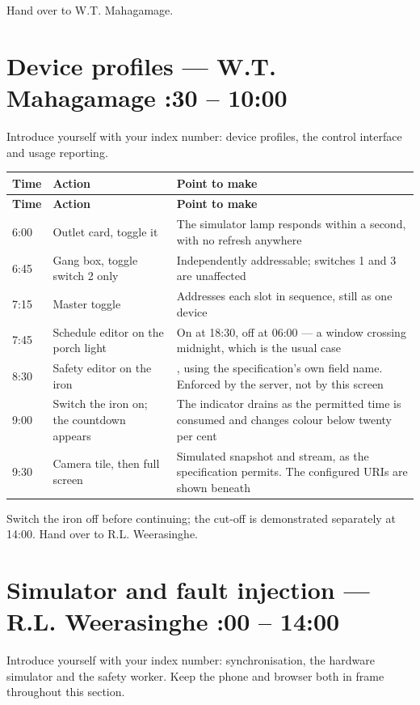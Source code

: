 \documentclass[11pt,a4paper]{article}
\makeatletter
\newenvironment{runsheet}
  {\begin{longtable}{@{}L{1.5cm}L{5.4cm}L{7.9cm}@{}}
   \toprule \textbf{Time} & \textbf{Action} & \textbf{Point to make} \\ \midrule
   \endfirsthead
   \toprule \textbf{Time} & \textbf{Action} & \textbf{Point to make} \\ \midrule
   \endhead}
  {\bottomrule\end{longtable}}
\makeatother
\begin{document}
Hand over to W.T. Mahagamage.

\section{Device profiles --- W.T. Mahagamage \hfill {}:30 -- 10:00}

Introduce yourself with your index number: device profiles, the control
interface and usage reporting.

\begin{runsheet}
6:00 & Outlet card, toggle it & The simulator lamp responds within a second, with no refresh anywhere \\
6:45 & Gang box, toggle switch 2 only & Independently addressable; switches 1 and 3 are unaffected \\
7:15 & Master toggle & Addresses each slot in sequence, still as one device \\
7:45 & Schedule editor on the porch light & On at 18:30, off at 06:00 --- a window crossing midnight, which is the usual case \\
8:30 & Safety editor on the iron & , using the specification's own field name. Enforced by the server, not by this screen \\
9:00 & Switch the iron on; the countdown appears & The indicator drains as the permitted time is consumed and changes colour below twenty per cent \\
9:30 & Camera tile, then full screen & Simulated snapshot and stream, as the specification permits. The configured URIs are shown beneath \\
\end{runsheet}

Switch the iron off before continuing; the cut-off is demonstrated separately at
14:00. Hand over to R.L. Weerasinghe.

\section{Simulator and fault injection --- R.L. Weerasinghe \hfill {}:00 -- 14:00}

Introduce yourself with your index number: synchronisation, the hardware
simulator and the safety worker. Keep the phone and browser both in frame
throughout this section.
\end{document}
